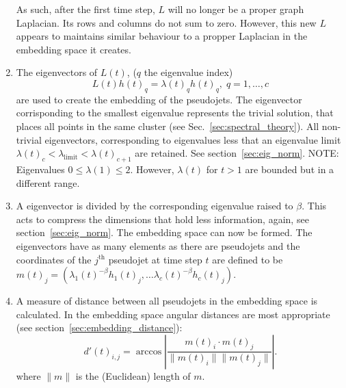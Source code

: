 \begin{enumerate}
        As such, after the first time step, \(L\) will no longer be a proper graph Laplacian.
        Its rows and columns do not sum to zero.
        However, this new \(L\) appears to maintains similar behaviour
        to a propper Laplacian in the embedding space it creates.

    \item \label{step:eigenvectors} The eigenvectors of $L(t)$, ($q$ the eigenvalue index)
            \begin{equation}
                L(t) h(t)_q = \lambda(t)_q h(t)_q,  \; q=1, \ldots, c
            \end{equation}
            	are used to create the embedding of the pseudojets.
            The eigenvector corrisponding to the smallest eigenvalue represents the trivial solution,
            that places all points in the same cluster (see Sec.~\ref{sec:spectral_theory}).
            All non-trivial eigenvectors, corresponding
            to eigenvalues less that an eigenvalue limit \(\lambda(t)_c < \lambda_\text{limit} < \lambda(t)_{c+1}\)
            are retained. See section~\ref{sec:eig_norm}.
            {NOTE: Eigenvalues $0\leq \lambda(1)\leq 2$.
            However, $\lambda(t)$ for $t>1$ are bounded but in a different range.} 

        \item \label{step:compression} A eigenvector is divided by the corresponding eigenvalue raised to \(\beta\).
            This acts to compress the dimensions that hold less information, again, see section~\ref{sec:eig_norm}.
            The embedding space can now be formed.
            The eigenvectors have as many elements as there are pseudojets and the coordinates of
            the \(j^\text{th}\) pseudojet at time step \(t\)
            are defined to be
            \(m(t)_j = \left(\lambda_1(t)^{-\beta} h_1(t)_j, \dots \lambda_c(t)^{-\beta} h_c(t)_j\right)\).

        \item  A measure of distance between all pseudojets in the embedding space is calculated.
            In the embedding space angular distances are most appropriate (see section~\ref{sec:embedding_distance}):
            \begin{equation}
                d'(t)_{i, j} = \arccos\left|\frac{m(t)_i\cdot m(t)_j}{\|m(t)_i\| \|m(t)_j\|}\right|.
            \end{equation}
            where \(\|m\|\) is the (Euclidean) length of \(m\).


\end{enumerate}

